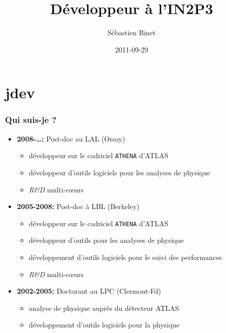 \documentclass[bigger]{beamer}
\title{D\'eveloppeur \`a l'IN2P3}
\author{S\'ebastien Binet}
\date{2011-09-29}
\institute[LAL]{\insertlogo\hskip0.1cm}
\providecommand{\alert}[1]{\textbf{#1}}
\begin{document}
\maketitle





\section{jdev}
\label{sec-1}
\begin{frame}
\frametitle{Qui suis-je ?}
\label{sec-1-1}


\begin{itemize}
\item \alert{2008-\ldots{}:} Post-doc au LAL (Orsay)
\begin{itemize}
\item d\'eveloppeur sur le cadriciel \verb~ATHENA~ d'ATLAS
\item d\'eveloppeur d'outils logiciels pour les analyses de physique
\item \emph{R\&D} multi-c\oe urs
\end{itemize}
\item \alert{2005-2008:} Post-doc \`a LBL (Berkeley)
\begin{itemize}
\item d\'eveloppeur sur le cadriciel \verb~ATHENA~ d'ATLAS
\item d\'eveloppeur d'outils pour les analyses de physique
\item d\'eveloppement d'outils logiciels pour le suivi des performances
\item \emph{R\&D} multi-c\oe urs
\end{itemize}
\item \alert{2002-2005:} Doctorant au LPC (Clermont-Fd)
\begin{itemize}
\item analyse de physique aupr\`es du d\'etecteur ATLAS
\item d\'eveloppement d'outils logiciels pour la physique
\end{itemize}
\end{itemize}
\end{frame}
\end{document}

